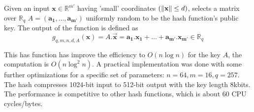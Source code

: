 \begin{description}
\begin{description}
            \begin{definition}
                 Given an input
                $\mathbf{x} \in \mathbb{R}^{m'}$ having 'small' coordinates
                $(\Vert \mathbf{x} \Vert \leq d)$, selects a matrix over
                $\mathbb{R}_q$ $A=(\mathbf{a_1, \dots,
                a_{m'}})$ uniformly random to be the hash function's public key.
                The output of the function is defined as
                \[
                    g_{q,m,n,d,A}(\mathbf{x}) = A.\vec{\mathbf{x}} =
                    \mathbf{a_1.x_1 + \dots + a_{m'}.x_{m'}} \in \mathbb{R}_q
                \]
                \label{def:AjtaiRing}
            \end{definition}
            This has function has improve the efficiency to $O(n\log n)$ for the
            key $A$, the computation is $O(n\log^2 n)$. A practical
            implementation was done \cite{lyubashevsky2008swifft} with some further
            optimizations for a specific set of parameters: $n = 64, m = 16, q =
            257$. The hash compresses 1024-bit input to 512-bit output with the
            key length 8kbits. The performance is competitive to other hash
            functions, which is about 60 CPU cycles/bytes.


\end{description}
\end{description}
